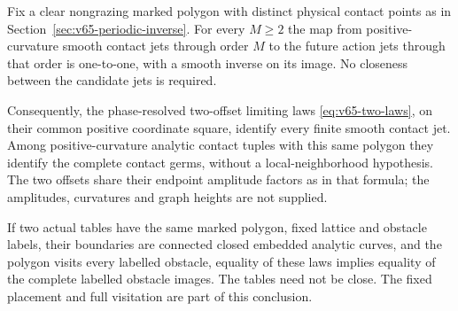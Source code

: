 \begin{theorem}
\label{thm:v66-global-rigidity}
Fix a clear nongrazing marked polygon with distinct physical contact
points as in Section~\ref{sec:v65-periodic-inverse}.  For every $M\ge2$
the map from positive-curvature smooth contact jets through order $M$
to the future action jets through that order is one-to-one, with a smooth
inverse on its image.  No closeness between the candidate jets is required.

Consequently, the phase-resolved two-offset limiting laws
\eqref{eq:v65-two-laws}, on their common positive coordinate square,
identify every finite smooth contact jet.  Among positive-curvature
analytic contact tuples with this same polygon they identify the complete
contact germs, without a local-neighborhood hypothesis.  The two offsets
share their endpoint amplitude factors as in that formula; the amplitudes,
curvatures and graph heights are not supplied.

If two actual tables have the same marked polygon, fixed lattice and
obstacle labels, their boundaries are connected closed embedded analytic
curves, and the polygon visits every labelled obstacle, equality of these
laws implies equality of the complete labelled obstacle images.  The
tables need not be close.  The fixed placement and full visitation are
part of this conclusion.
\end{theorem}
